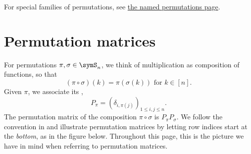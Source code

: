 



For special families of permutations, see \hyperref[namedPermutations]{the named permutations page}.


\section[permutationMatrix]{Permutation matrices}


For permutations $\pi,\sigma \in \symS_n$, we think
of multiplication as composition of functions, so that
\[
  (\pi \circ \sigma)(k) = \pi(\sigma(k)) \text{ for $k \in [n]$.}
\]
Given $\pi$, we associate its
\label{permutationMatrixDefinition},
\[
 P_\pi = \left( \delta_{i, \pi(j)} \right)_{1 \leq i, j \leq n}.
\]
The permutation matrix of the composition $\pi \circ \sigma$ is $P_{\pi} P_{\sigma}$.
We follow the convention in \cite{Kitaev2011}
and illustrate permutation matrices by letting row indices start at the \emph{bottom},
as in the figure below.
Throughout this page, this is the picture we have in mind when referring to
permutation matrices.

